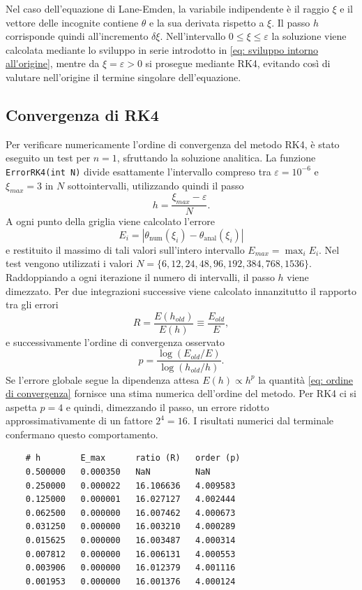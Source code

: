 \documentclass{article}
\numberwithin{equation}{section}
\begin{document}
Nel caso dell'equazione di Lane-Emden, la variabile indipendente è il raggio $\xi$ e il vettore delle incognite contiene $\theta$ e la sua derivata rispetto a $\xi$. Il passo $h$ corrisponde quindi all'incremento $\delta\xi$. Nell'intervallo $0 \leq \xi \leq \varepsilon$ la soluzione viene calcolata mediante lo sviluppo in serie introdotto in \eqref{eq: sviluppo intorno all'origine}, mentre da $\xi = \varepsilon > 0$ si prosegue mediante RK4, evitando così di valutare nell'origine il termine singolare dell'equazione.

\subsection{Convergenza di RK4}
Per verificare numericamente l'ordine di convergenza del metodo RK4, è stato eseguito un test per $n = 1$, sfruttando la soluzione analitica. La funzione \texttt{ErrorRK4(int N)} divide esattamente l'intervallo compreso tra $\varepsilon = 10^{-6}$ e $\xi_{max} = 3$ in $N$ sottointervalli, utilizzando quindi il passo
\begin{equation}
    h = \frac{\xi_{max} - \varepsilon}{N}.
\end{equation}
A ogni punto della griglia viene calcolato l'errore
\begin{equation}
    E_i = |\theta_{\mathrm{num}}(\xi_i) - \theta_{\mathrm{anal}}(\xi_i)|
\end{equation}
e restituito il massimo di tali valori sull'intero intervallo $E_{max} = \max_iE_i $. Nel test vengono utilizzati i valori $N = \{6,12,24,48,96,192,384,768,1536\}$. Raddoppiando a ogni iterazione il numero di intervalli, il passo $h$ viene dimezzato. Per due integrazioni successive viene calcolato innanzitutto il rapporto tra gli errori
\begin{equation}
    R = \frac{E(h_{old})}{E(h)} \equiv \frac{E_{old}}{E},
\end{equation}
e successivamente l'ordine di convergenza osservato
\begin{equation}
\label{eq: ordine di convergenza}
    p = \frac{\log(E_{old}/E)}{\log(h_{old}/h)}.
\end{equation}
Se l'errore globale segue la dipendenza attesa $E(h)\propto h^p$ la quantità \eqref{eq: ordine di convergenza} fornisce una stima numerica dell'ordine del metodo. Per RK4 ci si aspetta $p = 4$ e quindi, dimezzando il passo, un errore ridotto approssimativamente di un fattore $2^4 = 16$. I risultati numerici dal terminale confermano questo comportamento.
\begin{verbatim}
    # h        E_max      ratio (R)   order (p)
    0.500000   0.000350   NaN         NaN
    0.250000   0.000022   16.106636   4.009583
    0.125000   0.000001   16.027127   4.002444
    0.062500   0.000000   16.007462   4.000673
    0.031250   0.000000   16.003210   4.000289
    0.015625   0.000000   16.003487   4.000314
    0.007812   0.000000   16.006131   4.000553
    0.003906   0.000000   16.012379   4.001116
    0.001953   0.000000   16.001376   4.000124
\end{verbatim}
\end{document}
